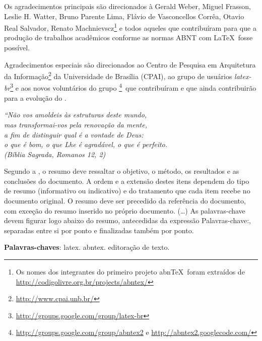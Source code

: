 \documentclass[
	12pt,				%
	openright,			%
	twoside,			%
	a4paper,			%
	english,			%
	brazil,				%
	]{abntex2}
\begin{document}
\begin{agradecimentos}
Os agradecimentos principais são direcionados à Gerald Weber, Miguel Frasson,
Leslie H. Watter, Bruno Parente Lima, Flávio de Vasconcellos Corrêa, Otavio Real
Salvador, Renato Machnievscz\footnote{Os nomes dos integrantes do primeiro
projeto abn\TeX\ foram extraídos de
\url{http://codigolivre.org.br/projects/abntex/}} e todos aqueles que
contribuíram para que a produção de trabalhos acadêmicos conforme
as normas ABNT com \LaTeX\ fosse possível.

Agradecimentos especiais são direcionados ao Centro de Pesquisa em Arquitetura
da Informação\footnote{\url{http://www.cpai.unb.br/}} da Universidade de
Brasília (CPAI), ao grupo de usuários
\emph{latex-br}\footnote{\url{http://groups.google.com/group/latex-br}} e aos
novos voluntários do grupo
\emph{\abnTeX}\footnote{\url{http://groups.google.com/group/abntex2} e
\url{http://abntex2.googlecode.com/}}~que contribuíram e que ainda
contribuirão para a evolução do \abnTeX.

\end{agradecimentos}

\begin{epigrafe}
    \vspace*{\fill}
	\begin{flushright}
		\textit{``Não vos amoldeis às estruturas deste mundo, \\
		mas transformai-vos pela renovação da mente, \\
		a fim de distinguir qual é a vontade de Deus: \\
		o que é bom, o que Lhe é agradável, o que é perfeito.\\
		(Bíblia Sagrada, Romanos 12, 2)}
	\end{flushright}
\end{epigrafe}


\begin{resumo}
 Segundo a , o resumo deve ressaltar o
 objetivo, o método, os resultados e as conclusões do documento. A ordem e a extensão
 destes itens dependem do tipo de resumo (informativo ou indicativo) e do
 tratamento que cada item recebe no documento original. O resumo deve ser
 precedido da referência do documento, com exceção do resumo inserido no
 próprio documento. (\ldots) As palavras-chave devem figurar logo abaixo do
 resumo, antecedidas da expressão Palavras-chave:, separadas entre si por
 ponto e finalizadas também por ponto.

 \vspace{\onelineskip}
    
 \noindent
 \textbf{Palavras-chaves}: latex. abntex. editoração de texto.
\end{resumo}
\end{document}
